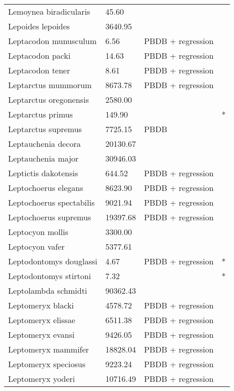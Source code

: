\documentclass{article}
\begin{document}
\begin{center}
\begin{longtable}{p{} p{} p{} p{}}
    Lemoynea biradicularis & 45.60 & \cite{Tomiya2013} &  \\ 
    Lepoides lepoides & 3640.95 & \cite{Tomiya2013} &  \\ 
    Leptacodon munusculum & 6.56 & PBDB + regression &  \\ 
    Leptacodon packi & 14.63 & PBDB + regression &  \\ 
    Leptacodon tener & 8.61 & PBDB + regression &  \\ 
    Leptarctus mummorum & 8673.78 & PBDB + regression &  \\ 
    Leptarctus oregonensis & 2580.00 & \cite{McKenna2011} &  \\ 
    Leptarctus primus & 149.90 & \cite{Tomiya2013} & * \\ 
    Leptarctus supremus & 7725.15 & PBDB &  \\ 
    Leptauchenia decora & 20130.67 & \cite{Tomiya2013} &  \\ 
    Leptauchenia major & 30946.03 & \cite{Tomiya2013} &  \\ 
    Leptictis dakotensis & 644.52 & PBDB + regression &  \\ 
    Leptochoerus elegans & 8623.90 & PBDB + regression &  \\ 
    Leptochoerus spectabilis & 9021.94 & PBDB + regression &  \\ 
    Leptochoerus supremus & 19397.68 & PBDB + regression &  \\ 
    Leptocyon mollis & 3300.00 & \cite{McKenna2011} &  \\ 
    Leptocyon vafer & 5377.61 & \cite{Tomiya2013} &  \\ 
    Leptodontomys douglassi & 4.67 & PBDB + regression & * \\ 
    Leptodontomys stirtoni & 7.32 & \cite{Stock1937} & * \\ 
    Leptolambda schmidti & 90362.43 & \cite{Zack2005} &  \\ 
    Leptomeryx blacki & 4578.72 & PBDB + regression &  \\ 
    Leptomeryx elissae & 6511.38 & PBDB + regression &  \\ 
    Leptomeryx evansi & 9426.05 & PBDB + regression &  \\ 
    Leptomeryx mammifer & 18828.04 & PBDB + regression &  \\ 
    Leptomeryx speciosus & 9223.24 & PBDB + regression &  \\ 
    Leptomeryx yoderi & 10716.49 & PBDB + regression &  \\ 

\end{longtable}
\end{center}
\end{document}
